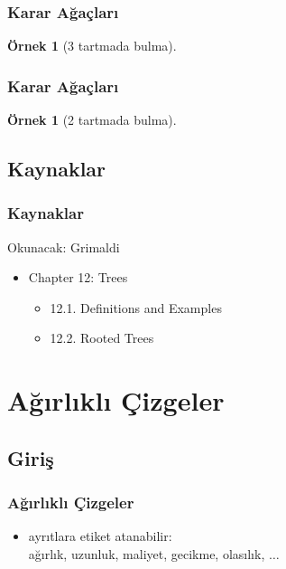 \documentclass[dvipsnames]{beamer}
\theoremstyle{definition}
\theoremstyle{example}
\newtheorem{ornek}[theorem]{Örnek}
\theoremstyle{plain}
\begin{document}
\begin{frame}
  \frametitle{Karar Ağaçları}

  \begin{ornek}[3 tartmada bulma]
    \begin{center}
    \end{center}
  \end{ornek}
\end{frame}

\begin{frame}
  \frametitle{Karar Ağaçları}

  \begin{ornek}[2 tartmada bulma]
    \begin{center}
    \end{center}
  \end{ornek}
\end{frame}

\subsection*{Kaynaklar}

\begin{frame}
  \frametitle{Kaynaklar}

  \begin{block}{Okunacak: Grimaldi}
    \begin{itemize}
      \item Chapter 12: Trees
      \begin{itemize}
        \item 12.1. \alert{Definitions and Examples}
        \item 12.2. \alert{Rooted Trees}
      \end{itemize}
    \end{itemize}
  \end{block}
\end{frame}

\section{Ağırlıklı Çizgeler}

\subsection{Giriş}

\begin{frame}
  \frametitle{Ağırlıklı Çizgeler}

  \begin{itemize}
    \item ayrıtlara etiket atanabilir:\\
      ağırlık, uzunluk, maliyet, gecikme, olasılık, $\ldots$
  \end{itemize}
\end{frame}
\end{document}
